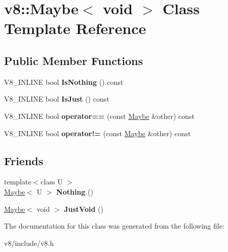 \hypertarget{classv8_1_1Maybe_3_01void_01_4}{}\section{v8\+:\+:Maybe$<$ void $>$ Class Template Reference}
\label{classv8_1_1Maybe_3_01void_01_4}
\subsection*{Public Member Functions}
\begin{DoxyCompactItemize}
\item 
\mbox{\label{classv8_1_1Maybe_3_01void_01_4_abad94678d5963f570bb8ac1fe4e14ba5}} 
V8\+\_\+\+I\+N\+L\+I\+NE bool {\bfseries Is\+Nothing} () const
\item 
\mbox{\label{classv8_1_1Maybe_3_01void_01_4_a266f5cd7dc4ded39d9cda680eb1eee24}} 
V8\+\_\+\+I\+N\+L\+I\+NE bool {\bfseries Is\+Just} () const
\item 
\mbox{\label{classv8_1_1Maybe_3_01void_01_4_a099f2d60103f0cc244af7f1841435715}} 
V8\+\_\+\+I\+N\+L\+I\+NE bool {\bfseries operator==} (const \mbox{\hyperlink{classv8_1_1Maybe}{Maybe}} \&other) const
\item 
\mbox{\label{classv8_1_1Maybe_3_01void_01_4_aba3a25b2a92dc722527fd55f98e2e341}} 
V8\+\_\+\+I\+N\+L\+I\+NE bool {\bfseries operator!=} (const \mbox{\hyperlink{classv8_1_1Maybe}{Maybe}} \&other) const
\end{DoxyCompactItemize}
\subsection*{Friends}
\begin{DoxyCompactItemize}
\item 
\mbox{\label{classv8_1_1Maybe_3_01void_01_4_aeb9593e125b42d748acbd69b72c89f37}} 
{\footnotesize template$<$class U $>$ }\\\mbox{\hyperlink{classv8_1_1Maybe}{Maybe}}$<$ U $>$ {\bfseries Nothing} ()
\item 
\mbox{\label{classv8_1_1Maybe_3_01void_01_4_a4c5708719ff5dd174c834831bba20784}} 
\mbox{\hyperlink{classv8_1_1Maybe}{Maybe}}$<$ void $>$ {\bfseries Just\+Void} ()
\end{DoxyCompactItemize}


The documentation for this class was generated from the following file\+:\begin{DoxyCompactItemize}
\item 
v8/include/v8.\+h\end{DoxyCompactItemize}
